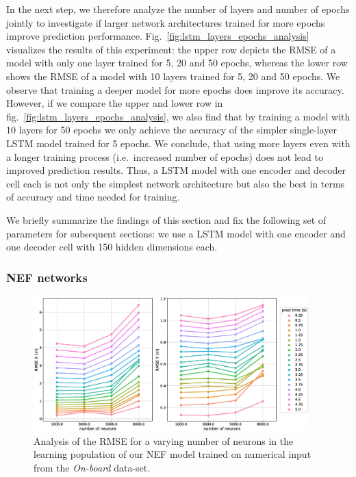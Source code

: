 In the next step, we therefore analyze the number of layers and number of epochs jointly to investigate if larger network architectures trained for more epochs improve prediction performance.
Fig.~\ref{fig:lstm_layers_epochs_analysis} visualizes the results of this experiment: the upper row depicts the \ac{RMSE} of a model with only one layer trained for \num{5}, \num{20} and \num{50} epochs, whereas the lower row shows the \ac{RMSE} of a model with \num{10} layers trained for \num{5}, \num{20} and \num{50} epochs. 
We observe that training a deeper model for more epochs does improve its accuracy.
However, if we compare the upper and lower row in fig.~\ref{fig:lstm_layers_epochs_analysis}, we also find that by training a model with \num{10} layers for \num{50} epochs we only achieve the accuracy of the simpler single-layer \ac{LSTM} model trained for \num{5} epochs.
We conclude, that using more layers even with a longer training process (i.e.\ increased number of epochs) does not lead to improved prediction results.
Thus, a \ac{LSTM} model with one encoder and decoder cell each is not only the simplest network architecture but also the best in terms of accuracy and time needed for training.

We briefly summarize the findings of this section and fix the following set of parameters for subsequent sections: we use a \ac{LSTM} model with one encoder and one decoder cell with \num{150} hidden dimensions each.


\subsubsection{\ac{NEF} networks}
\label{subsubsec:hyperparam_nef}
\begin{figure}[t!]
  \centering
  \includegraphics[width=0.95\textwidth]{imgs/nef_num_neurons_analysis.eps}
  \caption{Analysis of the \ac{RMSE} for a varying number of neurons in the learning population of our \ac{NEF} model trained on numerical input from the \emph{On-board} data-set.}
  \label{fig:nef_num_neurons_analysis}
\end{figure}

